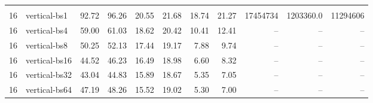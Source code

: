 \begin{table*}
\begin{tabular}{r l r r r r r r r r r}
\hline \\
16 &vertical-bs1 &92.72 & 96.26 & 20.55 & 21.68 & 18.74 & 21.27 & 17454734 & 1203360.0 & 11294606\\
16 &vertical-bs4 &59.00 & 61.03 & 18.62 & 20.42 & 10.41 & 12.41 & -- & -- & --\\
16 &vertical-bs8 &50.25 & 52.13 & 17.44 & 19.17 & 7.88 & 9.74 & -- & -- & --\\
16 &vertical-bs16 &44.52 & 46.23 & 16.49 & 18.98 & 6.60 & 8.32 & -- & -- & --\\
16 &vertical-bs32 &43.04 & 44.83 & 15.89 & 18.67 & 5.35 & 7.05 & -- & -- & --\\
16 &vertical-bs64 &47.19 & 48.26 & 15.52 & 19.02 & 5.30 & 7.00 & -- & -- & --\\
 
\end{tabular}
\label{tab:20-newsgroups-blocksize}
\end{table*}
